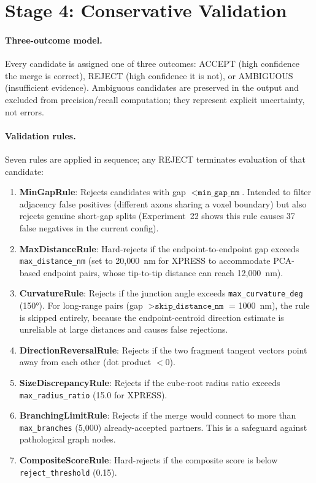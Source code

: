 \section{Stage 4: Conservative Validation}

\paragraph{Three-outcome model.}
Every candidate is assigned one of three outcomes: ACCEPT (high confidence the
merge is correct), REJECT (high confidence it is not), or AMBIGUOUS (insufficient
evidence). Ambiguous candidates are preserved in the output and excluded from
precision/recall computation; they represent explicit uncertainty, not errors.

\paragraph{Validation rules.}
Seven rules are applied in sequence; any REJECT terminates evaluation of
that candidate:

\begin{enumerate}
  \item \textbf{MinGapRule}: Rejects candidates with gap $< \texttt{min\_gap\_nm}$.
        Intended to filter adjacency false positives (different axons sharing a
        voxel boundary) but also rejects genuine short-gap splits (Experiment~22
        shows this rule causes 37 false negatives in the current config).

  \item \textbf{MaxDistanceRule}: Hard-rejects if the endpoint-to-endpoint gap
        exceeds \texttt{max\_distance\_nm} (set to 20{,}000~nm for XPRESS to
        accommodate PCA-based endpoint pairs, whose tip-to-tip distance can reach
        12{,}000~nm).

  \item \textbf{CurvatureRule}: Rejects if the junction angle exceeds
        \texttt{max\_curvature\_deg} (150°). For long-range pairs
        (gap $> \texttt{skip\_distance\_nm}$ = 1000~nm), the rule is skipped
        entirely, because the endpoint-centroid direction estimate is unreliable
        at large distances and causes false rejections.

  \item \textbf{DirectionReversalRule}: Rejects if the two fragment tangent
        vectors point away from each other (dot product $< 0$).

  \item \textbf{SizeDiscrepancyRule}: Rejects if the cube-root radius ratio
        exceeds \texttt{max\_radius\_ratio} (15.0 for XPRESS).

  \item \textbf{BranchingLimitRule}: Rejects if the merge would connect to more
        than \texttt{max\_branches} (5{,}000) already-accepted partners. This is
        a safeguard against pathological graph nodes.

  \item \textbf{CompositeScoreRule}: Hard-rejects if the composite score is below
        \texttt{reject\_threshold} (0.15).
\end{enumerate}

